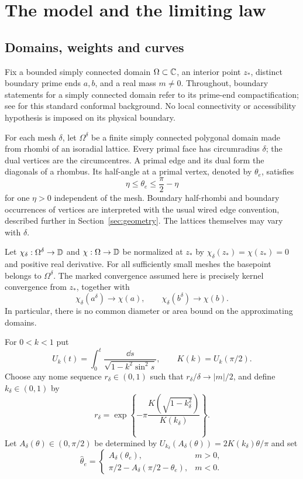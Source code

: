 \section{The model and the limiting law}\label{sec:model}\label{mod:section}

\subsection{Domains, weights and curves}
Fix a bounded simply connected domain $\Omega\subset\mathbb C$, an interior
point $z_*$, distinct boundary prime ends $a,b$, and a real mass
$m\ne0$. Throughout, boundary statements for a simply connected domain
refer to its prime-end compactification; see \cite{Pommerenke}
for this standard conformal background. No local connectivity or
accessibility hypothesis is imposed on its physical boundary.

For each mesh $\delta$, let $\Omega^\delta$ be a finite simply connected
polygonal domain made from rhombi of an isoradial lattice. Every primal face has
circumradius $\delta$; the dual vertices are the circumcentres. A primal
edge and its dual form the diagonals of a rhombus. Its half-angle at a
primal vertex, denoted by $\theta_e$, satisfies
\begin{equation}\label{mod:angles}
 \eta\le\theta_e\le\frac\pi2-\eta
\end{equation}
for one $\eta>0$ independent of the mesh. Boundary half-rhombi and
boundary occurrences of vertices are interpreted with the usual wired
edge convention, described further in Section~\ref{sec:geometry}.
The lattices themselves may vary with $\delta$.

Let $\chi_\delta:\Omega^\delta\to\mathbb D$ and
$\chi:\Omega\to\mathbb D$ be normalized at $z_*$ by
$\chi_\delta(z_*)=\chi(z_*)=0$ and positive real derivative. For all
sufficiently small meshes the basepoint belongs to $\Omega^\delta$.
The marked convergence assumed here is precisely kernel convergence
from $z_*$, together with
\begin{equation}\label{mod:marks}
 \chi_\delta(a^\delta)\longrightarrow\chi(a),\qquad
 \chi_\delta(b^\delta)\longrightarrow\chi(b).
\end{equation}
In particular, there is no common diameter or area bound on the
approximating domains.

For $0<k<1$ put
\[
 U_k(t)=\int_0^t\frac{\dd s}{\sqrt{1-k^2\sin^2s}},\qquad
 K(k)=U_k(\pi/2).
\]
Choose any nome sequence $r_\delta\in(0,1)$ such that
$r_\delta/\delta\to |m|/2$, and define $k_\delta\in(0,1)$ by
\[
 r_\delta=\exp\left\{-\pi\frac{K(\sqrt{1-k_\delta^2})}
 {K(k_\delta)}\right\}.
\]
Let $A_\delta(\theta)\in(0,\pi/2)$ be determined by
$U_{k_\delta}(A_\delta(\theta))=2K(k_\delta)\theta/\pi$ and set
\begin{equation}\label{mod:thermal-angle}
 \widehat\theta_e=
 \begin{cases}
 A_\delta(\theta_e),&m>0,\\
 \pi/2-A_\delta(\pi/2-\theta_e),&m<0.
 \end{cases}
\end{equation}

